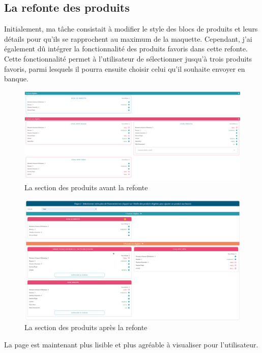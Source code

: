 \documentclass[12pt,oneside,noprintercorrection]{iut}
\begin{document}
\clearpage

\subsection{La refonte des produits}
Initialement, ma tâche consistait à modifier le style des blocs de produits et leurs détails pour qu'ils se rapprochent au maximum de la maquette. Cependant, j'ai également dû intégrer la fonctionnalité des produits favoris dans cette refonte. Cette fonctionnalité permet à l'utilisateur de sélectionner jusqu'à trois produits favoris, parmi lesquels il pourra ensuite choisir celui qu'il souhaite envoyer en banque.

\begin{figure}[!ht]
  \centering
  \includegraphics[width=14cm]{img/ProduitsAvant.png}
  \caption{La section des produits avant la refonte}
\end{figure}

\begin{figure}[!ht]
  \centering
  \includegraphics[width=14cm]{img/ProduitsApres.png}
  \caption{La section des produits après la refonte}
\end{figure}

La page est maintenant plus lisible et plus agréable à visualiser pour l'utilisateur.
\end{document}
